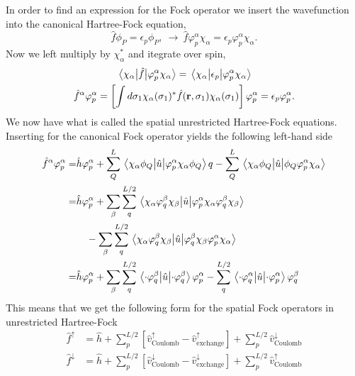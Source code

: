 In order to find an expression for the Fock operator we insert the wavefunction into the 
canonical Hartree-Fock equation,
\begin{equation}
    \hat{f}\phi_P = \epsilon_p\phi_P, \ \to \ 
    \hat{f}\varphi_p^\alpha \chi_\alpha = \epsilon_p\varphi_p^\alpha \chi_\alpha. 
\end{equation}
Now we left multiply by $\chi_\alpha^*$ and itegrate over spin,
\begin{gather}
    \mel{\chi_\alpha}{\hat{f}}{\varphi_p^\alpha\chi_\alpha}
    = \mel{\chi_\alpha}{\epsilon_p}{\varphi_p^\alpha\chi_\alpha} \\
    \hat{f}^\alpha \varphi_p^\alpha
    = \left[ 
        \int d\sigma_1 \chi_\alpha(\sigma_1)^*\hat{f}(\vb{r}, \sigma_1)\chi_\alpha(\sigma_1)     
    \right] \varphi_p^\alpha
    = \epsilon_p\varphi_p^\alpha.
\end{gather}
We now have what is called the spatial unrestricted Hartree-Fock equations. Inserting for 
the canonical Fock operator yields the following left-hand side
\begin{equation}
    \begin{aligned}
        \hat{f}^\alpha\varphi_p^\alpha 
        =& \hat{h}\varphi_p^\alpha 
        + \sum_Q^L \mel{\chi_\alpha \phi_Q}{\hat{u}}{\varphi_p^\alpha\chi_\alpha\phi_Q}q
        - \sum_Q^L \mel{\chi_\alpha \phi_Q}{\hat{u}}{\phi_Q\varphi_p^\alpha\chi_\alpha} \\
        =& \hat{h}\varphi_p^\alpha
        + \sum_\beta \sum_q^{L/2}
            \mel{\chi_\alpha\varphi^\beta_q\chi_\beta}{\hat{u}}{\varphi^\alpha_p\chi_\alpha\varphi^\beta_q\chi_\beta} \\
        & \quad - \sum_\beta \sum_q^{L/2}
            \mel{\chi_\alpha\varphi^\beta_q\chi_\beta}{\hat{u}}{\varphi^\beta_q\chi_\beta\varphi^\alpha_p\chi_\alpha} \\
        =& \hat{h} \varphi_p^\alpha
        + \sum_\beta \sum_q^{L/2}
            \mel{\cdot\varphi_q^\beta}{\hat{u}}{\cdot\varphi_q^\beta}\varphi_p^\alpha
        - \sum_q^{L/2}
            \mel{\cdot\varphi_q^\alpha}{\hat{u}}{\cdot\varphi_p^\alpha}\varphi_q^\beta
    \end{aligned}
\end{equation} 
This means that we get the following form for the spatial Fock operators in unrestricted Hartree-Fock 
\begin{align}
\label{eq:fock_up_uhf}
\hat{f}^\uparrow &= 
    \hat{h} + \sum_p^{L/2}[\hat{v}^\uparrow_{\text{Coulomb}} - \hat{v}^\uparrow_{\text{exchange}}]
    + \sum_p^{L/2}\hat{v}^\downarrow_{\text{Coulomb}}  \\
\label{eq:fock_down_uhf}
\hat{f}^\downarrow &= 
    \hat{h} + \sum_p^{L/2}[\hat{v}^\downarrow_{\text{Coulomb}} - \hat{v}^\downarrow_{\text{exchange}}]
    + \sum_p^{L/2}\hat{v}^\uparrow_{\text{Coulomb}}
\end{align}
